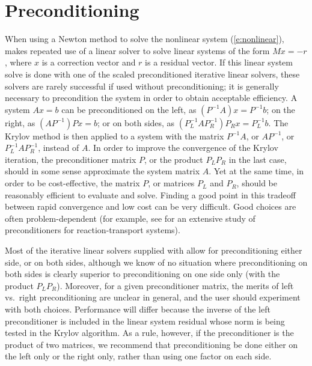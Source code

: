 \section{Preconditioning}\label{s:preconditioning}
When using a Newton method to solve the nonlinear system (\ref{e:nonlinear}),
{\cvode} makes repeated use of a linear solver to solve linear systems of the form
$M x = - r$, where $x$ is a correction vector and $r$ is a residual vector.
If this linear system solve is done with one of the scaled preconditioned iterative 
linear solvers, these solvers are rarely successful if used without preconditioning;
it is generally necessary to precondition the system in order to obtain acceptable efficiency.  
A system $A x = b$ can be preconditioned on the left, as $(P^{-1}A) x = P^{-1} b$;
on the right, as $(A P^{-1}) P x = b$; or on both sides, as
$(P_L^{-1} A P_R^{-1}) P_R x = P_L^{-1}b$.  The Krylov method is then
applied to a system with the matrix $P^{-1}A$, or $AP^{-1}$, or
$P_L^{-1} A P_R^{-1}$, instead of $A$.  In order to improve the
convergence of the Krylov iteration, the preconditioner matrix $P$, or
the product $P_L P_R$ in the last case, should in some sense
approximate the system matrix $A$.  Yet at the same time, in order to
be cost-effective, the matrix $P$, or matrices $P_L$ and $P_R$, should
be reasonably efficient to evaluate and solve.  Finding a good point
in this tradeoff between rapid convergence and low cost can be very
difficult.  Good choices are often problem-dependent (for example, see
\cite{BrHi:89} for an extensive study of preconditioners for
reaction-transport systems).

Most of the iterative linear solvers supplied with {\sundials} allow
for preconditioning either side, or on both sides, although we know of
no situation where preconditioning on both sides is clearly superior to
preconditioning on one side only (with the product $P_L P_R$).
Moreover, for a given preconditioner matrix, the merits of left vs.~right
preconditioning are unclear in general, and the user should experiment
with both choices.  Performance will differ because the inverse of the
left preconditioner is included in the linear system residual whose
norm is being tested in the Krylov algorithm.  As a rule, however, if
the preconditioner is the product of two matrices, we recommend that
preconditioning be done either on the left only or the right only,
rather than using one factor on each side.  

